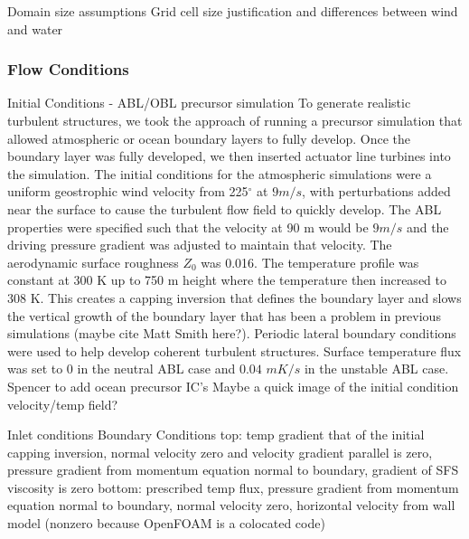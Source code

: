 Domain size assumptions
Grid cell size justification and differences between wind and water

\subsubsection{Flow Conditions}

Initial Conditions - ABL/OBL precursor simulation
To generate realistic turbulent structures, we took the approach of running a precursor simulation that allowed atmospheric or ocean boundary layers to fully develop.  Once the boundary layer was fully developed, we then inserted actuator line turbines into the simulation.  The initial conditions for the atmospheric simulations were a uniform geostrophic wind velocity from 225$^\circ$  at $9 m/s$, with perturbations added near the surface to cause the turbulent flow field to quickly develop.  The ABL properties were specified such that the velocity at 90 m would be $9 m/s$ and the driving pressure gradient was adjusted to maintain that velocity.  The aerodynamic surface roughness $Z_{0}$ was 0.016.  The temperature profile was constant at 300 K up to 750 m height where the temperature then increased to 308 K.  This creates a capping inversion that defines the boundary layer and slows the vertical growth of the boundary layer that has been a problem in previous simulations (maybe cite Matt Smith here?).  Periodic lateral boundary conditions were used to help develop coherent turbulent structures.  Surface temperature flux was set to 0 in the neutral ABL case and $0.04$ $mK/s$ in the unstable ABL case.
%
Spencer to add ocean precursor IC's
Maybe a quick image of the initial condition velocity/temp field?

Inlet conditions
Boundary Conditions
top: temp gradient that of the initial capping inversion, normal velocity zero and velocity gradient parallel is zero, pressure gradient from momentum equation normal to boundary, gradient of SFS viscosity is zero
bottom: prescribed temp flux, pressure gradient from momentum equation normal to boundary, normal velocity zero, horizontal velocity from wall model (nonzero because OpenFOAM is a colocated code)
